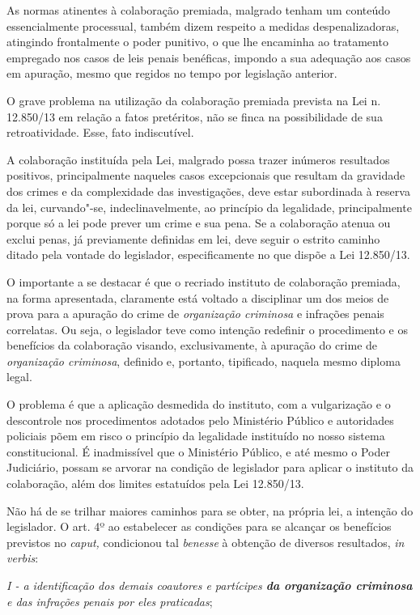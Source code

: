 As normas atinentes à colaboração premiada, malgrado tenham um conteúdo
essencialmente processual, também dizem respeito a medidas
despenalizadoras, atingindo frontalmente o poder punitivo, o que lhe
encaminha ao tratamento empregado nos casos de leis penais benéficas,
impondo a sua adequação aos casos em apuração, mesmo que regidos no
tempo por legislação anterior.

O grave problema na utilização da colaboração premiada prevista na Lei
n. 12.850/13 em relação a fatos pretéritos, não se finca na
possibilidade de sua retroatividade. Esse, fato indiscutível.

A colaboração instituída pela Lei, malgrado possa trazer inúmeros
resultados positivos, principalmente naqueles casos excepcionais que
resultam da gravidade dos crimes e da complexidade das investigações,
deve estar subordinada à reserva da lei, curvando"-se, indeclinavelmente,
ao princípio da legalidade, principalmente porque só a lei pode prever
um crime e sua pena. Se a colaboração atenua ou exclui penas, já
previamente definidas em lei, deve seguir o estrito caminho ditado pela
vontade do legislador, especificamente no que dispõe a Lei 12.850/13.

O importante a se destacar é que o recriado instituto de colaboração
premiada, na forma apresentada, claramente está voltado a disciplinar um
dos meios de prova para a apuração do crime de \emph{organização
criminosa} e infrações penais correlatas. Ou seja, o legislador teve
como intenção redefinir o procedimento e os benefícios da colaboração
visando, exclusivamente, à apuração do crime de \emph{organização
criminosa}, definido e, portanto, tipificado, naquela mesmo diploma
legal.

O problema é que a aplicação desmedida do instituto, com a vulgarização
e o descontrole nos procedimentos adotados pelo Ministério Público e
autoridades policiais põem em risco o princípio da legalidade instituído
no nosso sistema constitucional. É inadmissível que o Ministério
Público, e até mesmo o Poder Judiciário, possam se arvorar na condição
de legislador para aplicar o instituto da colaboração, além dos limites
estatuídos pela Lei 12.850/13.

Não há de se trilhar maiores caminhos para se obter, na própria lei, a
intenção do legislador. O art. 4º ao estabelecer as condições para se
alcançar os benefícios previstos no \emph{caput,} condicionou tal
\emph{benesse} à obtenção de diversos resultados, \emph{in verbis}:

\emph{I - a identificação dos demais coautores e partícipes \textbf{da
organização criminosa} e das infrações penais por eles praticadas};

